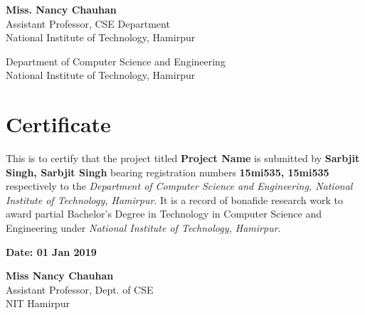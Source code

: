 \documentclass[a4paper,12 pt,oneside]{book}
\begin{document}
\begin{titlepage}
\begin{center}
        \textbf{Miss. Nancy Chauhan}\\
        Assistant Professor, CSE Department\\
        National Institute of Technology, Hamirpur\\
 
        \vspace{2.35cm}
        
        \large
 
        Department of Computer Science and  Engineering\\
        National Institute of Technology, Hamirpur\\
      
    \end{center}
\end{titlepage}

\chapter*{\centering Certificate}

This is to certify that the project titled \textbf{Project Name} is submitted by \textbf{Sarbjit Singh, Sarbjit Singh} bearing registration numbers \textbf{15mi535, 15mi535} respectively to the \textit{Department of Computer Science and Engineering, National Institute of Technology, Hamirpur}. It is a record of bonafide research work to award partial Bachelor’s Degree in Technology in Computer Science and Engineering under \textit{National Institute of Technology, Hamirpur}.

\vspace{2cm}

\noindent\textbf{Date: 01 Jan 2019}

\vspace{1cm}

\begin{multicols}{2}
    \noindent
    \begin{varwidth}{\textwidth}
    \end{varwidth}
    
    \columnbreak
    
    \hfill
    \begin{varwidth}{\textwidth}
        \textbf{Miss Nancy Chauhan}\\
        Assistant Professor, Dept. of CSE\\
        NIT Hamirpur
        
        \end{varwidth}
    
    

\end{multicols}
\end{document}
